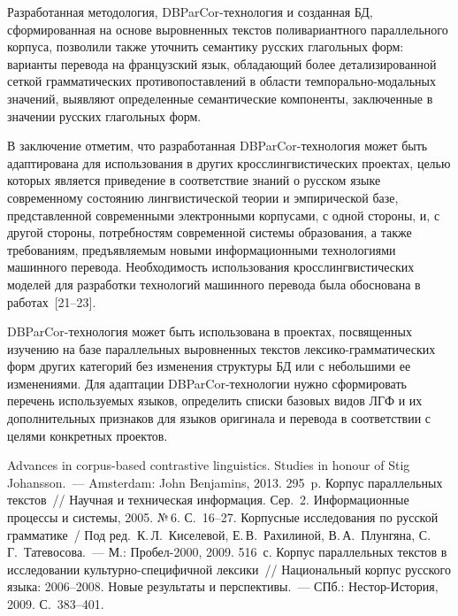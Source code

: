 \begin{multicols}{2}
  Разработанная методология, DBParCor-тех\-но\-ло\-гия и созданная БД,
сформированная на основе выровненных текстов поливариантного
параллельного корпуса, позволили также уточнить семантику русских
глагольных форм: варианты перевода на французский язык, обладающий более
детализированной сеткой грамматических противопоставлений в области
темпорально-модальных значений, выявляют определенные семантические
компоненты, заключенные в значении русских глагольных форм.

  В заключение отметим, что разработанная DBParCor-технология может быть
адаптирована для использования в других кросслингвистических проектах,
целью которых является приведение в соответствие знаний о русском языке
современному состоянию лингвистической теории и эмпирической базе,
представленной современными электронными корпусами, с одной стороны, и, с
другой стороны, потребностям современной системы образования, а также
требованиям, предъявляемым новыми информационными технологиями
машинного перевода. Необходимость использования кросслингвистических
моделей для разработки технологий машинного перевода была обоснована в
работах~[21--23].

  DBParCor-технология может быть использована в проектах, посвященных
изучению на базе параллельных выровненных текстов лексико-грам\-ма\-ти\-че\-ских
форм других категорий без изменения структуры БД или с небольшими ее
изменениями. Для адаптации DBParCor-технологии нужно сформировать
перечень используемых языков, определить списки базовых видов ЛГФ и их
дополнительных признаков для языков оригинала и перевода в соответствии с
целями конкретных проектов.

  {\small\frenchspacing
  {%
  \begin{thebibliography}{99}
 Advances in corpus-based contrastive linguistics. Studies in honour of Stig
Johansson.~--- Amsterdam: John Benjamins, 2013. 295~p.
 Корпус параллельных текстов~// Научная и техническая информация. Сер.~2.
Информационные процессы и системы, 2005. №\,6. С.~16--27.
Корпусные исследования по русской грамматике~/
Под ред.\ К.\,Л.~Киселевой, Е.\,В.~Рахилиной,
В.\,А.~Плунгяна, С.\,Г.~Татевосова.~--- М.: Пробел-2000,
2009. 516~с.
 Корпус параллельных текстов в исследовании культурно-специфичной
лексики~// Национальный корпус русского языка: 2006--2008. Новые
результаты и перспективы.~--- СПб.: Нестор-Ис\-то\-рия, 2009. С.~383--401.


\end{thebibliography}}}
\end{multicols}
